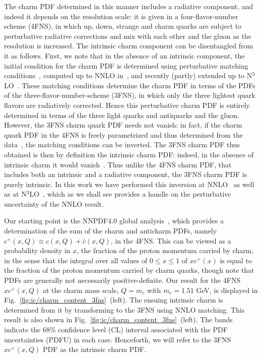 The charm PDF determined in this manner includes a 
radiative component, and
indeed it depends on the resolution scale: it is 
given in a four-flavor-number scheme (4FNS), in which up, 
down, strange and charm quarks are subject to  perturbative
radiative corrections and mix with each other and the gluon as the
resolution is increased.
%
The
intrinsic charm component can be disentangled from it as follows.
%
First, we
note that in the absence of an intrinsic component, the initial
condition for the charm PDF is determined using perturbative matching
conditions~\cite{Collins:1986mp}, computed  up to NNLO in~\cite{pdfnnlo},
and recently (partly) extended up to N$^3$LO~\cite{Bierenbaum:2009zt,Bierenbaum:2009mv,Ablinger:2010ty,Ablinger:2014vwa,Ablinger:2014uka,Behring:2014eya,Ablinger_2014,Ablinger:2014nga,Blumlein:2017wxd}.
%
These matching conditions 
determine the charm PDF in terms of the PDFs of the
three-flavor-number-scheme (3FNS), in which only the three lightest quark 
flavors are radiatively corrected.
%
Hence this perturbative charm PDF is
entirely determined in terms of the three light quarks and antiquarks
and the gluon.
%
However, the 3FNS charm quark PDF needs not
vanish: in fact, if the charm quark PDF in the 4FNS is freely
parametrized and thus determined from the data~\cite{Ball:2015tna},
the matching conditions can be inverted.
%
The 3FNS charm PDF
thus obtained is then by definition the intrinsic charm PDF: indeed, in
the absence of intrinsic charm it would vanish~\cite{Ball:2015dpa}. 
Thus unlike the 4FNS charm PDF, that
includes both an intrinsic and a radiative
component, the 3FNS charm
PDF is purely intrinsic.
%
In this work we have performed this inversion at
NNLO~\cite{pdfnnlo} as well as at N$^3$LO~\cite{Bierenbaum:2009zt,Bierenbaum:2009mv,Ablinger:2010ty,Ablinger:2014vwa,Ablinger:2014uka,Behring:2014eya,Ablinger_2014,Ablinger:2014nga,Blumlein:2017wxd},
which as we shall see provides a handle on the perturbative uncertainty of the NNLO result.

Our starting point is the NNPDF4.0 global
analysis~\cite{Ball:2021leu}, which provides a determination of
the sum of the charm and
anticharm PDFs, namely  $c^+(x,Q)\equiv c(x,Q)+\bar  c(x,Q)$, in the
4FNS. 
This can be viewed 
as a probability density in $x$, the fraction of the proton momentum
carried by charm, in the sense that the integral over all 
values of $0\le x\le1$ of 
$xc^+(x)$ is equal to  the fraction of
the proton momentum carried by charm quarks, though note that PDFs are
generally not necessarily positive-definite. 
%
Our result for  the 4FNS $xc^+(x,Q)$  at
the charm mass scale, $Q=m_c$ with $m_c=1.51$ GeV, 
is displayed in Fig.~\ref{fig:ic/charm_content_3fns}~(left).
%
%
The ensuing intrinsic charm is determined from it
by transforming to the 3FNS using
NNLO matching.
%
This result is also shown 
in Fig.~\ref{fig:ic/charm_content_3fns}~(left).
The bands  indicate the 68\% confidence level (CL) interval
associated with the PDF uncertainties  (PDFU) in each case.  Henceforth, we will refer to
the  3FNS $xc^+(x,Q)$ PDF as the
intrinsic charm PDF. 

